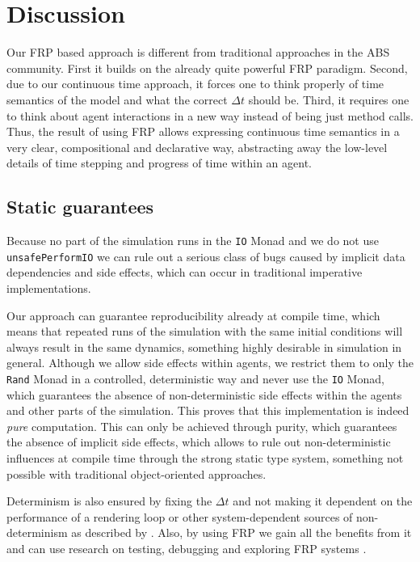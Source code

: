 \section{Discussion}
Our FRP based approach is different from traditional approaches in the ABS community. First it builds on the already quite powerful FRP paradigm. Second, due to our continuous time approach, it forces one to think properly of time semantics of the model and what the correct $\Delta t$ should be. Third, it requires one to think about agent interactions in a new way instead of being just method calls. Thus, the result of using FRP allows expressing continuous time semantics in a very clear, compositional and declarative way, abstracting away the low-level details of time stepping and progress of time within an agent.

\subsection{Static guarantees}
Because no part of the simulation runs in the \texttt{IO} Monad and we do not use \texttt{unsafePerformIO} we can rule out a serious class of bugs caused by implicit data dependencies and side effects, which can occur in traditional imperative implementations.

Our approach can guarantee reproducibility already at compile time, which means that repeated runs of the simulation with the same initial conditions will always result in the same dynamics, something highly desirable in simulation in general. Although we allow side effects within agents, we restrict them to only the \texttt{Rand} Monad in a controlled, deterministic way and never use the \texttt{IO} Monad, which guarantees the absence of non-deterministic side effects within the agents and other parts of the simulation. This proves that this implementation is indeed \textit{pure} computation. This can only be achieved through purity, which guarantees the absence of implicit side effects, which allows to rule out non-deterministic influences at compile time through the strong static type system, something not possible with traditional object-oriented approaches.

Determinism is also ensured by fixing the $\Delta t$ and not making it dependent on the performance of a rendering loop or other system-dependent sources of non-determinism as described by \cite{perez_testing_2017}. Also, by using FRP we gain all the benefits from it and can use research on testing, debugging and exploring FRP systems \cite{perez_back_2017,perez_testing_2017}.

